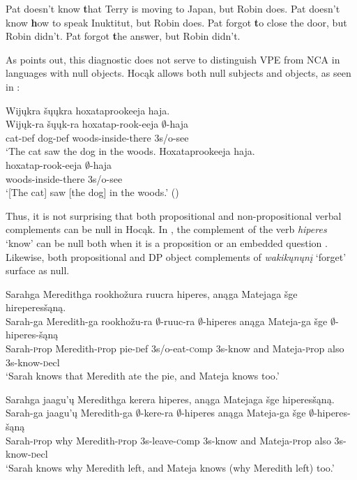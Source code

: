 \documentclass[output=paper]{LSP/langsci}
\begin{document}
\ea\label{ex:johnson:30}
\ea 
Pat doesn't know {\textbf that Terry is moving to Japan}, but Robin does.
\ex 
Pat doesn't know {\textbf how to speak Inuktitut}, but Robin does.
\ex 
Pat forgot {\textbf to close the door}, but Robin didn't.
\ex 
Pat forgot {\textbf the answer}, but Robin didn't.
\z
\z

As \citet{Fortin2007} points out, this diagnostic does not serve to distinguish VPE from NCA in languages with null objects. Hocąk allows both null subjects and objects, as seen in :

 
\ea
\ea 
\glll Wijųkra šųųkra hoxataprookeeja haja.\\
Wijųk-ra šųųk-ra hoxatap-rook-eeja $\emptyset$-haja\\
cat-{\textsc def} dog-{\textsc def} woods-inside-there {\textsc 3s/o}-see\\
\trans `The cat saw the dog in the woods. 
\ex\label{ex:johnson:31b} 
\glll Hoxataprookeeja haja.\\
hoxatap-rook-eeja $\emptyset$-haja\\
woods-inside-there {\textsc 3s/o}-see\\
\trans `[The cat] saw [the dog] in the woods.' (\citealt[7]{JohnsonEtAl2013b})
\z
\z


Thus, it is not surprising that both propositional and non-propositional verbal complements can be null in Hocąk. In , the complement of the verb \emph{hiperes} `know' can be null both when it is a proposition  or an embedded question . Likewise, both propositional  and DP object  complements of \emph{wakikųnųnį} `forget' surface as null.
 
\ea\label{ex:johnson:32}
\ea\label{ex:johnson:32a} 
\glll Sarahga Meredithga rookhožura ruucra hiperes, anąga Matejaga šge hireperesšąną.\\
Sarah-ga Meredith-ga rookhožu-ra $\emptyset$-ruuc-ra $\emptyset$-hiperes anąga Mateja-ga šge $\emptyset$-hiperes-šąną\\
Sarah-{\textsc prop} Meredith-{\textsc prop} pie-{\textsc def} {\textsc 3s/o}-eat-{\textsc comp} {\textsc 3s}-know and Mateja-{\textsc prop} also {\textsc 3s}-know-{\textsc decl}\\
\trans `Sarah knows that Meredith ate the pie, and Mateja knows too.'
 
\ex\label{ex:johnson:32b} 
\glll Sarahga jaagu'ų Meredithga kerera hiperes, anąga Matejaga šge hiperesšąną.\\
Sarah-ga jaagu'ų Meredith-ga $\emptyset$-kere-ra $\emptyset$-hiperes anąga Mateja-ga šge $\emptyset$-hiperes-šąną\\
Sarah-{\textsc prop} why Meredith-{\textsc prop} {\textsc 3s}-leave-{\textsc comp} {\textsc 3s}-know and Mateja-{\textsc prop} also {\textsc 3s}-know-{\textsc decl}\\
\trans `Sarah knows why Meredith left, and Mateja knows (why Meredith left) too.'
\z
\z
\end{document}
